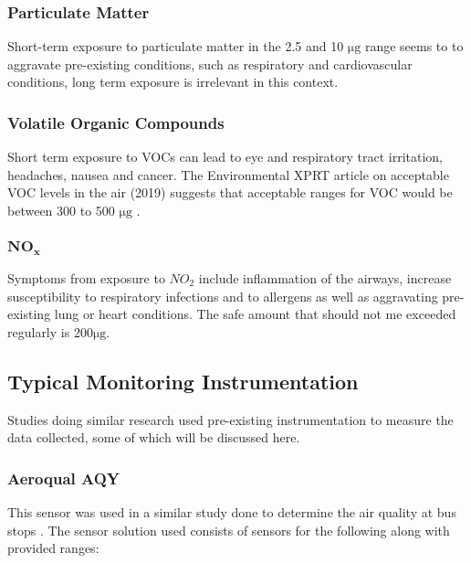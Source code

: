 \subsubsection{Particulate Matter }
Short-term exposure to particulate matter in the 2.5 and 10 $ \si{\micro\gram} $ range seems to to aggravate pre-existing conditions, such as respiratory and cardiovascular conditions\cite{pmparticles}, long term exposure is irrelevant in this context.





\subsubsection{Volatile Organic Compounds}
Short term exposure to VOCs can lead to eye and respiratory tract irritation, headaches, nausea and cancer\cite{safevocs}.
The Environmental XPRT article on acceptable VOC levels in the air (2019) \cite{vocs} suggests that acceptable ranges for VOC would be between 300 to 500 $ \si{\micro\gram} $ .

\subsubsection{$\mathbf{NO_x}$}
Symptoms from exposure to $NO_2$ include inflammation of the airways, increase susceptibility to respiratory infections and to allergens as well as aggravating pre-existing lung or heart conditions. The safe amount that should not me exceeded regularly is 200$ \si{\micro\gram} $.\cite{safenox}


\subsection{Typical Monitoring Instrumentation}
Studies doing similar research used pre-existing instrumentation to measure the data collected, some of which will be discussed here.

\subsubsection{Aeroqual AQY}
This sensor was used in a similar study done to determine the air quality at bus stops \cite{busstop}. 
The sensor solution used consists of sensors for the following along with provided ranges\cite{sensoraq}:

